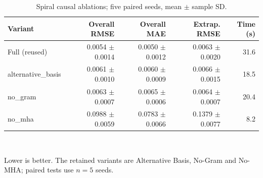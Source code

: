 \begin{table}[t]
\centering
\small
\caption{Spiral causal ablations; five paired seeds, mean $\pm$ sample SD.}
\label{tab:rebuttal-ablation}
\begin{tabular}{lrrrr}
\toprule
Variant & Overall RMSE & Overall MAE & Extrap. RMSE & Time (s) \\
\midrule
Full (reused) & 0.0054 $\pm$ 0.0014 & 0.0050 $\pm$ 0.0012 & 0.0063 $\pm$ 0.0020 & 31.6 \\
alternative\_basis & 0.0061 $\pm$ 0.0010 & 0.0060 $\pm$ 0.0009 & 0.0066 $\pm$ 0.0015 & 18.5 \\
no\_gram & 0.0063 $\pm$ 0.0007 & 0.0065 $\pm$ 0.0006 & 0.0064 $\pm$ 0.0007 & 20.4 \\
no\_mha & 0.0988 $\pm$ 0.0059 & 0.0783 $\pm$ 0.0066 & 0.1379 $\pm$ 0.0077 & 8.2 \\
\bottomrule
\end{tabular}
\\[-1mm]
\begin{minipage}{0.96\linewidth}\footnotesize Lower is better. The retained variants are Alternative Basis, No-Gram and No-MHA; paired tests use $n=5$ seeds.\end{minipage}
\end{table}

